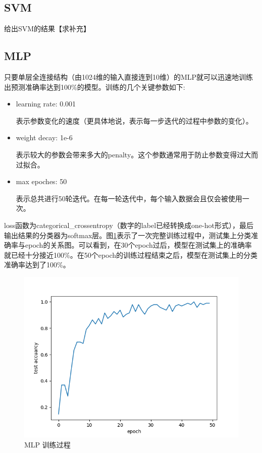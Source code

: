 \documentclass[UTF8]{ctexart}
\begin{document}
\subsection{SVM}

给出SVM的结果【求补充】

\subsection{MLP}

只要单层全连接结构（由1024维的输入直接连到10维）的MLP就可以迅速地训练出预测准确率达到100\%的模型。训练的几个关键参数如下:

\begin{itemize}
	\item learning rate: 0.001
	
	表示参数变化的速度（更具体地说，表示每一步迭代的过程中参数的变化）。
	
	\item weight decay:	1e-6
	
	表示较大的参数会带来多大的penalty。这个参数通常用于防止参数变得过大而过拟合。
	
	\item max epoches: 50
	
	表示总共进行50轮迭代。在每一轮迭代中，每个输入数据会且仅会被使用一次。
\end{itemize}

loss函数为categorical\_crossentropy（数字的label已经转换成one-hot形式），最后输出结果的分类器为softmax层。图\ref{MLP}表示了一次完整训练过程中，测试集上分类准确率与epoch的关系图。可以看到，在30个epoch过后，模型在测试集上的准确率就已经十分接近100\%。在50个epoch的训练过程结束之后，模型在测试集上的分类准确率达到了100\%。

\begin{figure}
	\centering
	\includegraphics{nn}
	\caption{MLP 训练过程}
	\label{MLP}
\end{figure}
\end{document}
